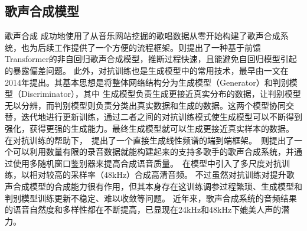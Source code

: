\subsection{歌声合成模型}
歌声合成
\citet{ren2020deepsinger}成功地使用了从音乐网站挖掘的歌唱数据从零开始构建了歌声合成系统，也为后续工作提供了一个方便的流程框架。\citet{blaauw2020sequence}则提出了一种基于前馈Transformer的非自回归歌声合成模型，推断过程快速，且能避免自回归模型引起的暴露偏差问题。
此外，对抗训练也是生成模型中的常用技术，最早由\citet{GAN}一文在2014年提出。其基本思想是将整体网络结构分为生成模型（Generator）和判别模型（Discriminator），其中
生成模型负责生成更接近真实分布的数据，让判别模型无以分辨，而判别模型则负责分类出真实数据和生成的数据。这两个模型协同交替，迭代地进行更新训练，通过二者之间的对抗训练模式使生成模型可以不断得到强化，获得更强的生成能力。最终生成模型就可以生成更接近真实样本的数据。
在对抗训练的帮助下，\citet{lee2019adversarially}~提出了一个直接生成线性频谱的端到端框架。\citet{wu2020adversarially}~则提出了一个可以利用数量有限的录音数据就能构建起来的支持多歌手的歌声合成系统，并通过使用多随机窗口鉴别器来提高合成语音质量。\citet{chen2020hifisinger}~在模型中引入了多尺度对抗训练，以相对较高的采样率（48kHz）合成高清音频。
不过虽然对抗训练对提升歌声合成模型的合成能力很有作用，但其本身存在这训练调参过程繁琐、生成模型和判别模型训练更新不稳定、难以收敛等问题。
近年来，歌声合成系统的音频结果的语音自然度和多样性都在不断提高，已显现在24kHz和48kHz下媲美人声的潜力。
